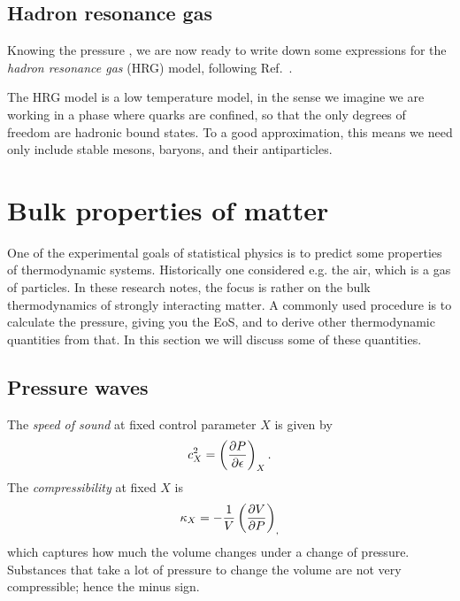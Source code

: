 \subsection{Hadron resonance gas}\label{sec:HRG}

Knowing the pressure , we are now ready to write down
some expressions for the {\it hadron resonance gas} (HRG) model,
following Ref.~\cite{karsch_probing_2011}.

The HRG model is a low temperature model, in the sense we imagine we are working
in a phase where quarks are confined, so that the only degrees of freedom are
hadronic bound states. To a good approximation, this means we need only include
stable mesons, baryons, and their antiparticles.

\section{Bulk properties of matter}

One of the experimental goals of statistical physics is to predict some
properties of thermodynamic systems. Historically one considered e.g.
the air, which is a gas of particles. In these research notes, the focus
is rather on the bulk thermodynamics of strongly interacting matter.
A commonly used procedure is to calculate the pressure, giving
you the EoS, and to derive other thermodynamic quantities from that.
In this section we will discuss some of these quantities.

\subsection{Pressure waves}
The {\it speed of sound} at fixed control parameter $X$
is given by
\begin{equation}
  c_X^2=\left(\pdv{P}{\epsilon}\right)_{X}.
\end{equation}
The {\it compressibility} at fixed $X$ is
\begin{equation}
  \kappa_X=-\frac{1}{V}\left(\pdv{V}{P}\right)_{,}
\end{equation}
which captures how much the volume changes under a change of pressure.
Substances that take a lot of pressure to change the volume are not
very compressible; hence the minus sign.



